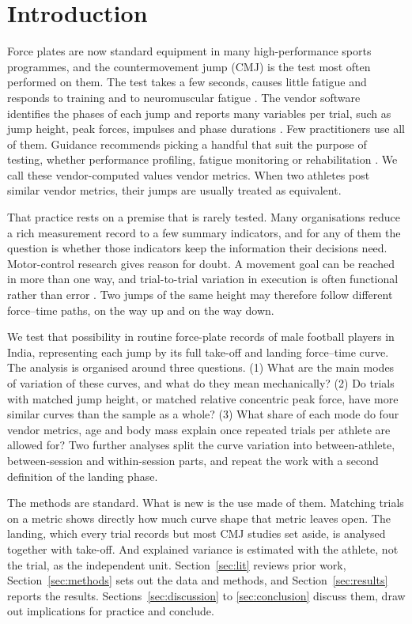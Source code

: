 \section{Introduction}
\label{sec:intro}

Force plates are now standard equipment in many high-performance sports programmes, and the countermovement jump (CMJ) is the test most often performed on them. The test takes a few seconds, causes little fatigue and responds to training and to neuromuscular fatigue \parencite{claudino2017,gathercole2015}. The vendor software identifies the phases of each jump and reports many variables per trial, such as jump height, peak forces, impulses and phase durations \parencite{mcmahon2018}. Few practitioners use all of them. Guidance recommends picking a handful that suit the purpose of testing, whether performance profiling, fatigue monitoring or rehabilitation \parencite{bishop2023}. We call these vendor-computed values vendor metrics. When two athletes post similar vendor metrics, their jumps are usually treated as equivalent.

That practice rests on a premise that is rarely tested. Many organisations reduce a rich measurement record to a few summary indicators, and for any of them the question is whether those indicators keep the information their decisions need. Motor-control research gives reason for doubt. A movement goal can be reached in more than one way, and trial-to-trial variation in execution is often functional rather than error \parencite{davids2003,bartlett2007,preatoni2013}. Two jumps of the same height may therefore follow different force--time paths, on the way up and on the way down.

We test that possibility in routine force-plate records of male football players in India, representing each jump by its full take-off and landing force--time curve. The analysis is organised around three questions. (1) What are the main modes of variation of these curves, and what do they mean mechanically? (2) Do trials with matched jump height, or matched relative concentric peak force, have more similar curves than the sample as a whole? (3) What share of each mode do four vendor metrics, age and body mass explain once repeated trials per athlete are allowed for? Two further analyses split the curve variation into between-athlete, between-session and within-session parts, and repeat the work with a second definition of the landing phase.

The methods are standard. What is new is the use made of them. Matching trials on a metric shows directly how much curve shape that metric leaves open. The landing, which every trial records but most CMJ studies set aside, is analysed together with take-off. And explained variance is estimated with the athlete, not the trial, as the independent unit. Section~\ref{sec:lit} reviews prior work, Section~\ref{sec:methods} sets out the data and methods, and Section~\ref{sec:results} reports the results. Sections~\ref{sec:discussion} to \ref{sec:conclusion} discuss them, draw out implications for practice and conclude.

